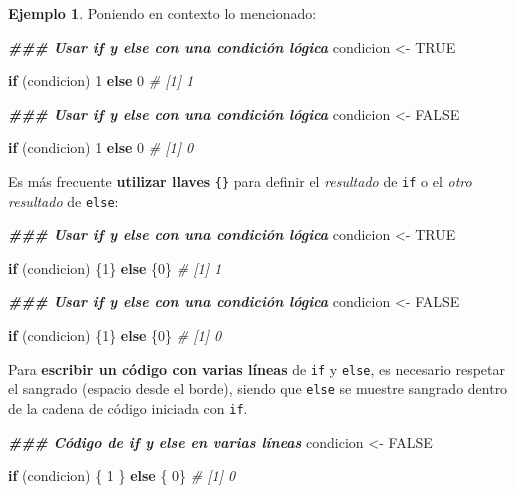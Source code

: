 \documentclass[
]{article}
\newenvironment{Shaded}{\begin{snugshade}}{\end{snugshade}}
\newcommand{\CommentTok}[1]{\textcolor[rgb]{0.56,0.35,0.01}{\textit{#1}}}
\newcommand{\ConstantTok}[1]{\textcolor[rgb]{0.00,0.00,0.00}{#1}}
\newcommand{\ControlFlowTok}[1]{\textcolor[rgb]{0.13,0.29,0.53}{\textbf{#1}}}
\newcommand{\DecValTok}[1]{\textcolor[rgb]{0.00,0.00,0.81}{#1}}
\newcommand{\DocumentationTok}[1]{\textcolor[rgb]{0.56,0.35,0.01}{\textbf{\textit{#1}}}}
\newcommand{\NormalTok}[1]{#1}
\newcommand{\OtherTok}[1]{\textcolor[rgb]{0.56,0.35,0.01}{#1}}
\theoremstyle{definition}
\theoremstyle{definition}
\newtheorem{example}{Ejemplo}[section]
\theoremstyle{definition}
\theoremstyle{definition}
\theoremstyle{remark}
\begin{document}
\begin{example}

Poniendo en contexto lo mencionado:

\begin{Shaded}
\begin{Highlighting}[]
\DocumentationTok{\#\#\# Usar if y else con una condición lógica}
\NormalTok{condicion }\OtherTok{\textless{}{-}} \ConstantTok{TRUE}

\ControlFlowTok{if}\NormalTok{ (condicion) }\DecValTok{1} \ControlFlowTok{else} \DecValTok{0}
\CommentTok{\# [1] 1}

\DocumentationTok{\#\#\# Usar if y else con una condición lógica}
\NormalTok{condicion }\OtherTok{\textless{}{-}} \ConstantTok{FALSE}

\ControlFlowTok{if}\NormalTok{ (condicion) }\DecValTok{1} \ControlFlowTok{else} \DecValTok{0}
\CommentTok{\# [1] 0}
\end{Highlighting}
\end{Shaded}

Es más frecuente \textbf{utilizar llaves} \texttt{\{\}} para definir el \emph{resultado} de \texttt{if} o el \emph{otro resultado} de \texttt{else}:

\begin{Shaded}
\begin{Highlighting}[]
\DocumentationTok{\#\#\# Usar if y else con una condición lógica}
\NormalTok{condicion }\OtherTok{\textless{}{-}} \ConstantTok{TRUE}

\ControlFlowTok{if}\NormalTok{ (condicion) \{}\DecValTok{1}\NormalTok{\} }\ControlFlowTok{else}\NormalTok{ \{}\DecValTok{0}\NormalTok{\}}
\CommentTok{\# [1] 1}

\DocumentationTok{\#\#\# Usar if y else con una condición lógica}
\NormalTok{condicion }\OtherTok{\textless{}{-}} \ConstantTok{FALSE}

\ControlFlowTok{if}\NormalTok{ (condicion) \{}\DecValTok{1}\NormalTok{\} }\ControlFlowTok{else}\NormalTok{ \{}\DecValTok{0}\NormalTok{\}}
\CommentTok{\# [1] 0}
\end{Highlighting}
\end{Shaded}

Para \textbf{escribir un código con varias líneas} de \texttt{if} y \texttt{else}, es necesario respetar el sangrado (espacio desde el borde), siendo que \texttt{else} se muestre sangrado dentro de la cadena de código iniciada con \texttt{if}.

\begin{Shaded}
\begin{Highlighting}[]
\DocumentationTok{\#\#\# Código de if y else en varias líneas}
\NormalTok{condicion }\OtherTok{\textless{}{-}} \ConstantTok{FALSE}

\ControlFlowTok{if}\NormalTok{ (condicion) \{}
  \DecValTok{1}
\NormalTok{  \} }\ControlFlowTok{else}\NormalTok{ \{}
    \DecValTok{0}\NormalTok{\}}
\CommentTok{\# [1] 0}
\end{Highlighting}
\end{Shaded}

\end{example}
\end{document}
